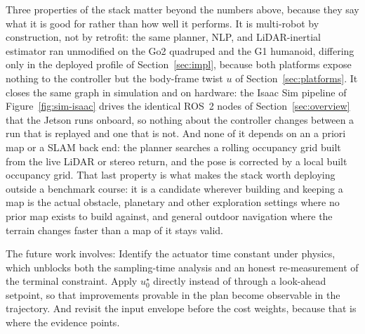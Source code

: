 \documentclass[11pt,a4paper]{article}
\begin{document}
Three properties of the stack matter beyond the numbers above, because they say what it is good for rather
than how well it performs. It is multi-robot by construction, not by retrofit: the same planner, NLP, and
LiDAR-inertial estimator ran unmodified on the Go2 quadruped and the G1 humanoid, differing only in the
deployed profile of Section~\ref{sec:impl}, because both platforms expose nothing to the controller but the
body-frame twist $u$ of Section~\ref{sec:platforms}. It closes the same graph in simulation and on hardware:
the Isaac Sim pipeline of Figure~\ref{fig:sim-isaac} drives the identical ROS~2 nodes of
Section~\ref{sec:overview} that the Jetson runs onboard, so nothing about the controller changes between a
run that is replayed and one that is not. And none of it depends on an a priori map or a SLAM back end: the
planner searches a rolling occupancy grid built from the live LiDAR or stereo return, and the pose is corrected
by a local built occupancy grid. That last property is
what makes the stack worth deploying outside a benchmark course: it is a candidate wherever building and
keeping a map is the actual obstacle, planetary and other exploration settings where no prior map exists to
build against, and general outdoor navigation where the terrain changes faster than a map of it stays valid.

The future work involves: Identify the actuator time constant under physics, which unblocks
both the sampling-time analysis and an honest re-measurement of the terminal constraint. Apply $u^\star_0$
directly instead of through a look-ahead setpoint, so that improvements provable in the plan become
observable in the trajectory. And revisit the input envelope before the cost weights, because that is where
the evidence points.

\newpage
{\footnotesize

}
\end{document}

